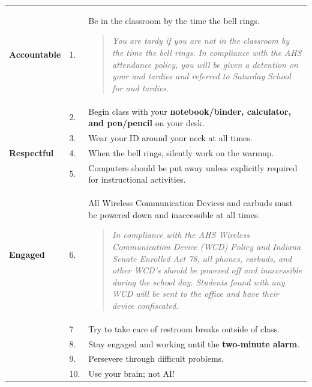 \documentclass[10pt]{exam}
\newcommand{\mg}{\rowcolor{Goldenrod}}
\begin{document}
\begin{center}
  \begin{tabular}
    {
      p{2.2cm}
      p{0.5cm}
      p{12.54cm}
		}
		
    \hline
      \mg \bf Accountable 
      & 1. & 
			Be in the classroom by the time the bell rings.
			  \vspace{-1em}
				\begin{quotation}
					\noindent\small
					\textit{You are tardy if you are not in the classroom by the time the bell rings.  In compliance with the AHS attendance policy, you will be given a detention on your \nth{3} and \nth{4} tardies and referred to Saturday School for \nth{5} and \nth{6} tardies.}
				\end{quotation}
			\\
			\mg  &  2. & 
			Begin class with your \textbf{notebook/binder, calculator, and pen/pencil} on your desk.
			\\
			\mg  &  3. & 
			Wear your ID around your neck at all times.
      \\
    \hline
    \bf Respectful
				&  4. &
				When the bell rings, silently work on the warmup.
				\\   
				&  5. & 
				Computers should be put away unless explicitly required for instructional activities.
				\\
    \hline
      \mg \bf Engaged
			&  6. & 
			All Wireless Communication Devices and earbuds must be powered down and inaccessible at all times. 
				\vspace{-1em}
				\begin{quotation}
					\noindent\small
					\textit{In compliance with the AHS Wireless Communication Device (WCD) Policy and Indiana Senate Enrolled Act 78, all phones, earbuds, and other WCD's should be powered off and inaccessible during the school day.  Students found with any WCD will be sent to the office and have their device confiscated.}
				\end{quotation}
      \\  
      \mg	&  7 & 
			Try to take care of restroom breaks outside of class.
      \\
      \mg &  8. &
			Stay engaged and working until the {\bf two-minute alarm}.
      \\
      \mg & 9. & 
			Persevere through difficult problems.
      \\  
			\mg & 10. & 
			Use your brain; not AI!
      \\  
    \hline
  \end{tabular}
\end{center}
\end{document}
